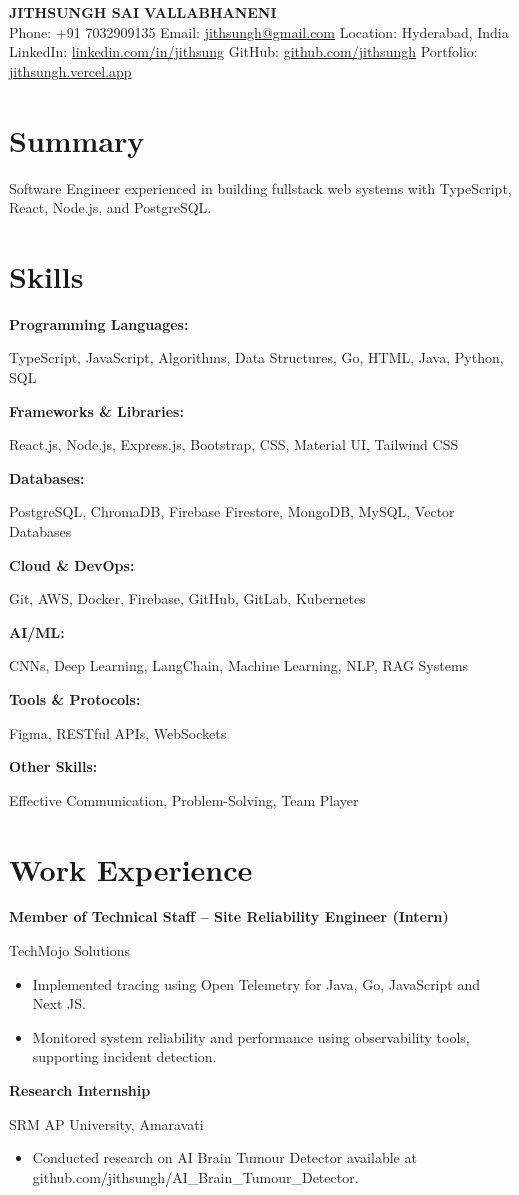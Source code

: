 \documentclass[a4paper,10pt]{article}
\newcommand{\tworow}[2]{%
  \noindent%
  \begin{minipage}[t]{0.615\textwidth}\raggedright #1\end{minipage}%
  \hfill%
  \begin{minipage}[t]{0.365\textwidth}\raggedleft #2\end{minipage}%
  \par%
}
\newcommand{\resumeheader}[3]{%
  \begin{center}
    {\LARGE \textbf{#1}} \\[0.5em]
    \small #2 \\[0.3em]
    \small #3
  \end{center}
}
\newcommand{\expentry}[3]{%
  \tworow{\textbf{#1}}{#2}%
  \ifx\relax#3\relax\else\textit{\small #3}\par\fi
}
\newenvironment{rbullets}{%
  \vspace{0.12em}%
  \begin{itemize}[leftmargin=1.1em, labelsep=0.4em, label=\textbullet,
                  itemsep=0.12em, topsep=0.08em, parsep=0pt, partopsep=0pt]%
}{%
  \end{itemize}%
}
\newcommand{\entrygap}{\vspace{0.55em}}
\newcommand{\skillrow}[2]{%
  \noindent%
  \begin{minipage}[t]{0.27\textwidth}\raggedright\textbf{#1}\end{minipage}%
  \begin{minipage}[t]{0.73\textwidth}\raggedright #2\end{minipage}%
  \par\vspace{0.18em}%
}
\begin{document}
\resumeheader{JITHSUNGH SAI VALLABHANENI}{%
  Phone: +91 7032909135 \quad  Email: \href{mailto:jithsungh@gmail.com}{jithsungh@gmail.com} \quad  Location: Hyderabad, India }{%
  LinkedIn: \href{https://linkedin.com/in/jithsung}{linkedin.com/in/jithsung} \quad  GitHub: \href{https://github.com/jithsungh}{github.com/jithsungh} \quad  Portfolio: \href{https://jithsungh.vercel.app}{jithsungh.vercel.app} }

\section*{Summary}
Software Engineer experienced in building fullstack web systems with TypeScript, React, Node.js, and PostgreSQL.

\section*{Skills}
\skillrow{Programming Languages:}{TypeScript, JavaScript, Algorithms, Data Structures, Go, HTML, Java, Python, SQL}
\skillrow{Frameworks \& Libraries:}{React.js, Node.js, Express.js, Bootstrap, CSS, Material UI, Tailwind CSS}
\skillrow{Databases:}{PostgreSQL, ChromaDB, Firebase Firestore, MongoDB, MySQL, Vector Databases}
\skillrow{Cloud \& DevOps:}{Git, AWS, Docker, Firebase, GitHub, GitLab, Kubernetes}
\skillrow{AI/ML:}{CNNs, Deep Learning, LangChain, Machine Learning, NLP, RAG Systems}
\skillrow{Tools \& Protocols:}{Figma, RESTful APIs, WebSockets}
\skillrow{Other Skills:}{Effective Communication, Problem-Solving, Team Player}

\section*{Work Experience}
\expentry{Member of Technical Staff -- Site Reliability Engineer (Intern)}{TechMojo Solutions}{}
\begin{rbullets}
  \item Implemented tracing using Open Telemetry for Java, Go, JavaScript and Next JS.
  \item Monitored system reliability and performance using observability tools, supporting incident detection.
\end{rbullets}
\entrygap
\expentry{Research Internship}{SRM AP University, Amaravati}{}
\begin{rbullets}
  \item Conducted research on AI Brain Tumour Detector available at github.com/jithsungh/AI\_Brain\_Tumour\_Detector.
\end{rbullets}
\end{document}
